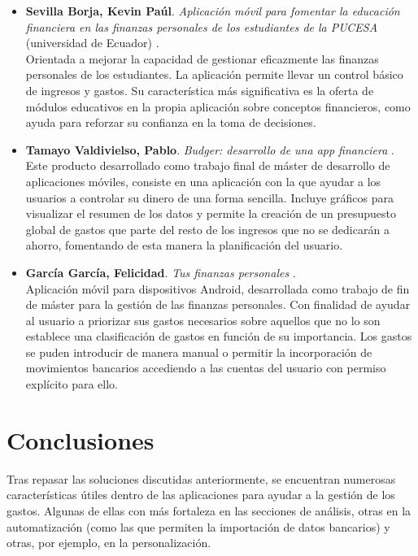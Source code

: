 \begin{itemize}
    \item \textbf{Sevilla Borja, Kevin Paúl}. 
    \textit{Aplicación móvil para fomentar la educación financiera en las finanzas personales 
    de los estudiantes de la PUCESA} (universidad de Ecuador) \cite{sevilla2024aplicacion}. \\
    Orientada a mejorar la capacidad
    de gestionar eficazmente las finanzas personales de los estudiantes. La aplicación 
    permite llevar un control básico de ingresos y gastos. Su característica más significativa 
    es la oferta de módulos educativos en la propia aplicación sobre conceptos financieros, como 
    ayuda para reforzar su confianza en la toma de decisiones.

    \item \textbf{Tamayo Valdivielso, Pablo}. 
    \textit{Budger: desarrollo de una app financiera} \cite{tamayo2022aplicacion}. \\ 
    Este producto desarrollado como 
    trabajo final de máster de desarrollo de aplicaciones móviles, consiste en una aplicación 
    con la que ayudar a los usuarios a controlar su dinero de una forma sencilla. Incluye 
    gráficos para visualizar el resumen de los datos y 
    permite la creación de un presupuesto global de gastos que parte del resto de los ingresos 
    que no se dedicarán a ahorro, fomentando de esta manera la planificación del usuario.

    \item \textbf{García García, Felicidad}. 
    \textit{Tus finanzas personales} \cite{garcia2019aplicacion}. \\  
    Aplicación móvil para dispositivos Android, 
    desarrollada como trabajo de fin de máster para la gestión de las finanzas personales. 
    Con finalidad de ayudar al usuario a priorizar sus gastos necesarios sobre aquellos
    que no lo son establece una clasificación de gastos en función de su importancia. 
    Los gastos se puden introducir de manera manual o permitir la incorporación de 
    movimientos bancarios accediendo a las cuentas del usuario con permiso explícito para ello.
    
\end{itemize}

\section{Conclusiones}
Tras repasar las soluciones discutidas anteriormente, se encuentran numerosas 
características útiles dentro de las aplicaciones para ayudar a la gestión 
de los gastos. Algunas de ellas con más fortaleza en las secciones de análisis, 
otras en la automatización (como las que permiten la importación de datos bancarios) y  
otras, por ejemplo, en la personalización. 

